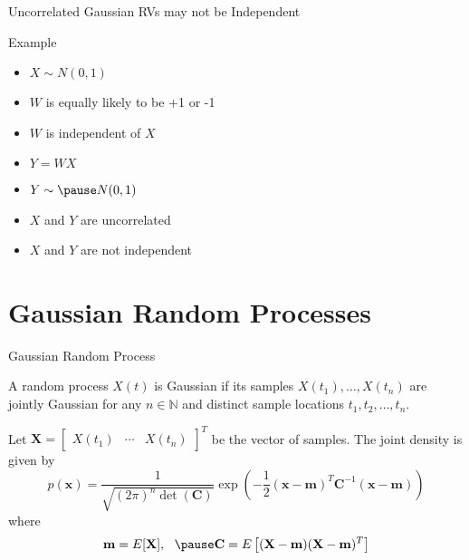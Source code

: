 \documentclass[t]{beamer}
\begin{document}
\begin{frame}{Uncorrelated Gaussian RVs may not be Independent}
  \footnotesize
  \begin{block}{Example}
    \begin{itemize}
      \item $X \sim N(0,1)$
      \pause
      \item $W$ is equally likely to be +1 or -1
      \pause
      \item $W$ is independent of $X$
      \pause
      \item $Y = WX$
      \pause
      \item $Y \sim \pause N(0,1)$
      \pause
      \item $X$ and $Y$ are uncorrelated
      \pause
      \item $X$ and $Y$ are not independent
    \end{itemize}
  \end{block}
  \normalsize
\end{frame}


\section{Gaussian Random Processes}
\begin{frame}{Gaussian Random Process}
  \footnotesize
  \pause
  \begin{definition}[]
    A random process $X(t)$ is Gaussian if its samples $X(t_1),\ldots,X(t_n)$ are jointly Gaussian for any $n\in \mathbb{N}$ and distinct sample locations $t_1, t_2, \ldots, t_n$.
  \end{definition}

  \pause Let $\mathbf{X} = \begin{bmatrix} X(t_1) & \cdots & X(t_n) \end{bmatrix}^T$ be the vector of samples. \pause The joint density is given by
  \begin{equation*}
    p(\mathbf{x}) = \frac{1}{\sqrt{(2\pi)^n\det(\mathbf{C})}} \exp\left(-\frac{1}{2} (\mathbf{x}-\mathbf{m})^T\mathbf{C}^{-1}(\mathbf{x}-\mathbf{m})\right)
  \end{equation*}
  \pause where
  \begin{eqnarray*}
    \mathbf{m} = E[\mathbf{X}], \ \  \pause \mathbf{C} = E\left[ (\mathbf{X}-\mathbf{m})(\mathbf{X}-\mathbf{m})^T\right]
  \end{eqnarray*}
  \normalsize
\end{frame}
\end{document}
